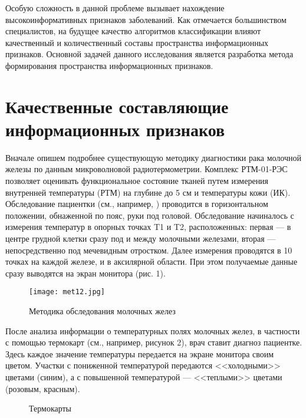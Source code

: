 Особую сложность в данной проблеме вызывает нахождение
высокоинформативных признаков заболеваний. Как отмечается
большинством специалистов, на будущее качество алгоритмов
классификации влияют качественный и количественный составы
пространства информационных признаков. Основной задачей данного
исследования является разработка метода формирования пространства
информационных признаков.

\section{Качественные составляющие информационных признаков}

Вначале опишем подробнее существующую методику диагностики рака молочной железы по данным микроволновой радиотермометрии.
Комплекс РТМ-01-РЭС позволяет оценивать функциональное состояние
тканей путем измерения внутренней температуры (РТМ) на глубине до
5 см и температуры кожи (ИК). Обследование пациентки (см.,
например, \cite{vaysblat}) проводится в горизонтальном положении,
обнаженной по пояс, руки под головой. Обследование начиналось с
измерения температур в опорных точках T1 и T2, расположенных:
первая ---  в центре грудной клетки сразу под и между молочными
железами, вторая --- непосредственно под мечевидным отростком. Далее
измерения проводятся в 10 точках на каждой железе, и в аксилярной
области. При этом  получаемые данные сразу выводятся на экран
монитора (рис. 1).


\begin{figure}[!h]\begin{center}
\texttt{[image: met12.jpg]}
\caption{Методика обследования молочных желез}
\end{center}\end{figure}


После анализа информации о температурных полях молочных желез, в
частности с помощью термокарт (см., например, рисунок 2), врач ставит
диагноз пациентке. Здесь каждое значение температуры передается
на экране монитора своим цветом. Участки с пониженной
температурой передаются <<холодными>> цветами (синим), а с
повышенной температурой --- <<теплыми>> цветами (розовым, красным).

\begin{figure}[!h]
\caption{Термокарты}
\vspace*{5mm}
\end{figure}




